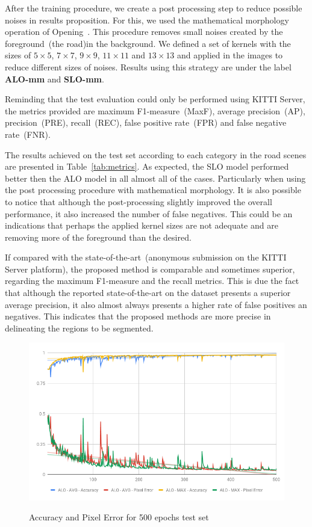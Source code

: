 After the training procedure, we create a post processing step to reduce possible noises in results proposition. For this, we used the mathematical morphology operation of Opening~\cite{najman13}. This procedure removes small noises created by the foreground~(the road)in the background. We defined a set of kernels with the sizes of $5\times5$, $7\times7$, $9\times9$, $11\times11$ and $13\times13$ and applied in the images to reduce different sizes of noises. Results using this strategy are under the label \textbf{ALO-mm} and \textbf{SLO-mm}.

Reminding that the test evaluation could only be performed using KITTI Server, the metrics provided are maximum F1-measure~(MaxF), average precision~(AP), precision~(PRE), recall~(REC), false positive rate~(FPR) and false negative rate~(FNR). 

The results achieved  on the test set according to each category in the road scenes are presented in Table~\ref{tab:metrics}. As expected, the SLO model performed better then the ALO model in all almost all of the cases. Particularly when using the post processing procedure with mathematical morphology. It is also possible to notice that although the post-processing slightly improved the overall performance, it also increased the number of false negatives. This could be an indications that perhaps the applied kernel sizes are not adequate and are removing more of the foreground than the desired.   

If compared with the state-of-the-art~(anonymous submission on the KITTI Server platform), the proposed method is comparable and sometimes superior, regarding the maximum F1-measure and the recall metrics. This is due the fact that although the reported state-of-the-art on the dataset presents a superior average precision, it also almost always presents a higher rate of false positives an negatives. This indicates that the proposed methods are more precise in delineating the regions to be segmented.       





\begin{figure}
  \caption{Accuracy and Pixel Error for 500 epochs test set}
  \centering
  \includegraphics[width=1.\columnwidth]{figures/falreis/val_acc_500_epochs.png}\label{fig:val_acc_500_epochs}
\end{figure}


